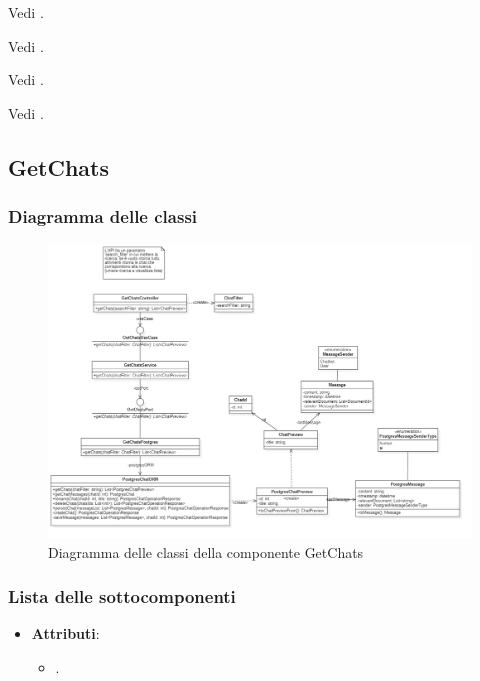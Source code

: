 \documentclass[10pt, a4paper]{article}
\begin{document}
Vedi .


Vedi .

Vedi .

Vedi .





\subsection{GetChats}
\subsubsection{Diagramma delle classi}


\begin{figure}[H]
    \centering        
    \includegraphics[width=16.5cm]{img/GetChat.png}
    \caption{Diagramma delle classi della componente GetChats}
\end{figure}
\subsubsection{Lista delle sottocomponenti}

\label{ChatFilterDettaglio}
\begin{itemize}
    \item \textbf{Attributi}:
    \begin{itemize}
        \item {}.
    \end{itemize}
\end{itemize}
\end{document}

